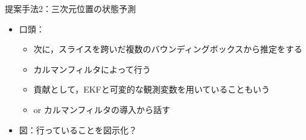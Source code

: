 \begin{frame}[noframenumbering]{提案手法2：三次元位置の状態予測}
    \begin{itemize}
        \item 口頭：
        \begin{itemize}
            \item 次に，スライスを跨いだ複数のバウンディングボックスから推定をする
            \item カルマンフィルタによって行う
            \item 貢献として，EKFと可変的な観測変数を用いていることもいう
            \item or カルマンフィルタの導入から話す
        \end{itemize}
        \item 図：行っていることを図示化？
    \end{itemize}
\end{frame}

